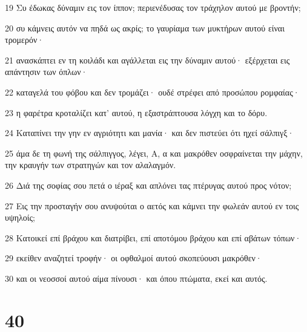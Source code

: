 \par 19 Συ έδωκας δύναμιν εις τον ίππον; περιενέδυσας τον τράχηλον αυτού με βροντήν;
\par 20 συ κάμνεις αυτόν να πηδά ως ακρίς; το γαυρίαμα των μυκτήρων αυτού είναι τρομερόν·
\par 21 ανασκάπτει εν τη κοιλάδι και αγάλλεται εις την δύναμιν αυτού· εξέρχεται εις απάντησιν των όπλων·
\par 22 καταγελά του φόβου και δεν τρομάζει· ουδέ στρέφει από προσώπου ρομφαίας·
\par 23 η φαρέτρα κροταλίζει κατ' αυτού, η εξαστράπτουσα λόγχη και το δόρυ.
\par 24 Καταπίνει την γην εν αγριότητι και μανία· και δεν πιστεύει ότι ηχεί σάλπιγξ·
\par 25 άμα δε τη φωνή της σάλπιγγος, λέγει, Α, α και μακρόθεν οσφραίνεται την μάχην, την κραυγήν των στρατηγών και τον αλαλαγμόν.
\par 26 Διά της σοφίας σου πετά ο ιέραξ και απλόνει τας πτέρυγας αυτού προς νότον;
\par 27 Εις την προσταγήν σου ανυψούται ο αετός και κάμνει την φωλεάν αυτού εν τοις υψηλοίς;
\par 28 Κατοικεί επί βράχου και διατρίβει, επί αποτόμου βράχου και επί αβάτων τόπων·
\par 29 εκείθεν αναζητεί τροφήν· οι οφθαλμοί αυτού σκοπεύουσι μακρόθεν·
\par 30 και οι νεοσσοί αυτού αίμα πίνουσι· και όπου πτώματα, εκεί και αυτός.

\chapter{40}

